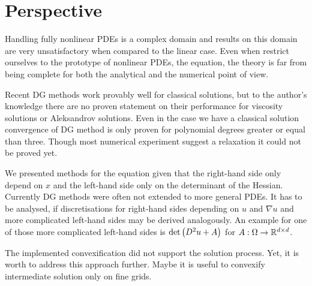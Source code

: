 \section{Perspective}
Handling fully nonlinear PDEs is a complex domain and results on this domain are very unsatisfactory when compared to the linear case. Even when restrict ourselves to the prototype of nonlinear PDEs, the \MA equation, the theory is far from being complete for both the analytical and the numerical point of view.

Recent DG methods work provably well for classical solutions, but to the author's knowledge there are no proven statement on their performance for viscosity solutions or Aleksandrov solutions. Even in the case we have a classical solution convergence of DG method is only proven for polynomial degrees greater or equal than three. Though most numerical experiment suggest a relaxation it could not be proved yet.

We presented methods for the \MA equation given that the right-hand side only depend on $x$ and the left-hand side only on the determinant of the Hessian. Currently DG methods were often not extended to more general PDEs. It has to be analysed, if  discretisations for right-hand sides depending on $u$ and $\nabla u$ and more complicated left-hand sides may be derived analogously. An example for one of those more complicated left-hand sides is $\det{\left(D^2 u +A\right)}$ for $A:\Omega \rightarrow \mathbb{R}^{d \times d}$.
 
The implemented convexification did not support the solution process. Yet, it is worth to address this approach further. Maybe it is useful to convexify intermediate solution only on fine grids.


